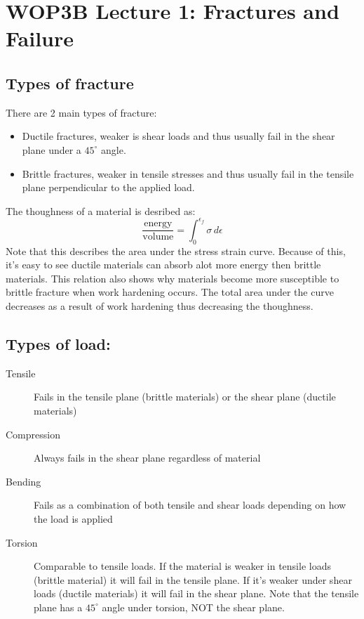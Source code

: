 \documentclass[11pt, a4paper]{article}
\begin{document}
\setcounter{section}{0}
\section{WOP3B Lecture 1: Fractures and Failure}


\subsection{Types of fracture}
There are 2 main types of fracture:
\begin{itemize}
  \item Ductile fractures, weaker is shear loads and thus usually fail in the shear plane under a $45^\circ$ angle.
  \item Brittle fractures, weaker in tensile stresses and thus usually fail in the tensile plane perpendicular to the applied load.
\end{itemize}
The thoughness of a material is desribed as:
\begin{equation}
  \frac{\text{energy}}{\text{volume}} = \int_0^{\epsilon_f} \sigma\,d\epsilon
\end{equation}
Note that this describes the area under the stress strain curve. Because of this, it's easy to see ductile materials can absorb alot more energy then brittle materials. This relation also shows why materials become more susceptible to brittle fracture when work hardening occurs. The total area under the curve decreases as a result of work hardening thus decreasing the thoughness.

\subsection{Types of load:}
\begin{description}
  \item[Tensile] Fails in the tensile plane (brittle materials) or the shear plane (ductile materials)
  \item[Compression] Always fails in the shear plane regardless of material
  \item[Bending] Fails as a combination of both tensile and shear loads depending on how the load is applied
  \item[Torsion] Comparable to tensile loads. If the material is weaker in tensile loads (brittle material) it will fail in the tensile plane. If it's weaker under shear loads (ductile materials) it will fail in the shear plane. Note that the tensile plane has a $45^\circ$ angle under torsion, NOT the shear plane.
\end{description}
\end{document}
